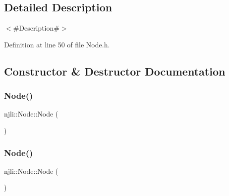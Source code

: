 \subsection{Detailed Description}
$<$\#\+Description\#$>$ 

Definition at line 50 of file Node.\+h.



\subsection{Constructor \& Destructor Documentation}
\mbox{\label{classnjli_1_1_node_a91aae9499658e92fc326ea9f9e1678f6}} 
\subsubsection{\texorpdfstring{Node()}{Node()}\hspace{0.1cm}{\footnotesize\ttfamily [1/3]}}
{\footnotesize\ttfamily njli\+::\+Node\+::\+Node (\begin{DoxyParamCaption}{ }\end{DoxyParamCaption})\hspace{0.3cm}{\ttfamily [protected]}}

\mbox{\label{classnjli_1_1_node_a5d925e98c91ec97042a0c91e9602edff}} 
\subsubsection{\texorpdfstring{Node()}{Node()}\hspace{0.1cm}{\footnotesize\ttfamily [2/3]}}
{\footnotesize\ttfamily njli\+::\+Node\+::\+Node (\begin{DoxyParamCaption}\item[{const \mbox{\hyperlink{classnjli_1_1_abstract_builder}{Abstract\+Builder}} \&}]{ }\end{DoxyParamCaption})\hspace{0.3cm}{\ttfamily [protected]}}

\mbox{\label{classnjli_1_1_node_a97a94f2f5f107c86d284238cc95602bf}} 
